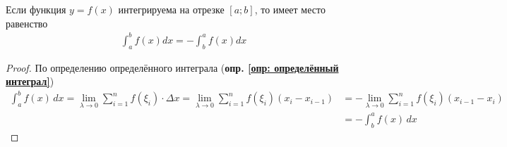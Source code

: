 \begin{theorem}
    Если функция $y=f(x)$ интегрируема на отрезке $[a;b]$, то имеет место равенство
    \begin{gather*}
        \boxed{\int_{a}^{b} f(x) dx = - \int_{b}^{a} f(x) dx}
    \end{gather*}
\end{theorem}
\begin{proof}
    По определению определённого интеграла (\textbf{опр. \ref{опр: определённый интеграл}})
    \begin{align*}
        \int_{a}^{b} f(x)\, dx = \lim_{\lambda \to 0} \sum_{i=1}^{n} f(\xi_i)\cdot \Delta x = \lim_{\lambda \to 0} \sum_{i=1}^{n} f(\xi_i)(x_i - x_{i-1}) &= - \lim_{\lambda \to 0} \sum_{i=1}^{n} f(\xi_i) (x_{i-1} - x_i) \\
        & = - \int_{b}^{a} f(x)\, dx
    \end{align*}
\end{proof}

